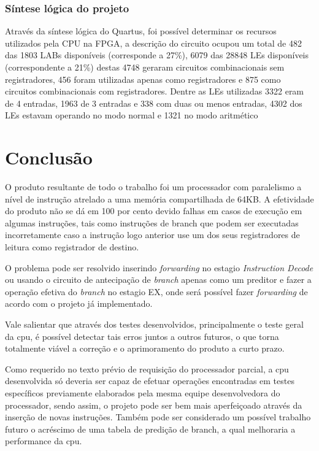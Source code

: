 \documentclass[
	11pt,				%
	openany,			%
	oneside,
	a4paper,			%
	chapter=TITLE,		%
	section=TITLE,		%
	english,			%
	brazil				%
	]{abntex2}
\begin{document}
\subsection{Síntese lógica do projeto}
Através da síntese lógica do Quartus, foi possível determinar os recursos utilizados pela CPU na FPGA, a descrição do circuito ocupou um total de 482 das 1803 LABs disponíveis (corresponde a 27\%), 6079 das 28848 LEs disponíveis (correspondente a 21\%) destas 4748 geraram circuitos combinacionais sem registradores, 456 foram utilizadas apenas como registradores e 875 como circuitos combinacionais com registradores. Dentre as LEs utilizadas 3322 eram de 4 entradas, 1963 de 3 entradas e 338 com duas ou menos entradas, 4302 dos LEs estavam operando no modo normal e 1321 no modo aritmético


\chapter{Conclusão}
O produto resultante de todo o trabalho foi um processador com paralelismo a nível de instrução atrelado a uma memória compartilhada de 64KB. A efetividade do produto não se dá em 100 por cento devido falhas em casos de execução em algumas instruções, tais como instruções de branch que podem ser executadas incorretamente caso a instrução logo anterior use um dos seus registradores de leitura como registrador de destino.

O problema pode ser resolvido inserindo \textit{forwarding} no estagio \textit{Instruction Decode} ou usando o circuito de antecipação de \textit{branch} apenas como um preditor e fazer a operação efetiva do \textit{branch} no estagio EX, onde será possível fazer \textit{forwarding} de acordo com o projeto já implementado.

Vale salientar que através dos testes desenvolvidos, principalmente o teste geral da cpu, é possível detectar tais erros juntos a outros futuros, o que torna totalmente viável a correção e o aprimoramento do produto a curto prazo.

Como requerido no texto prévio de requisição do processador parcial, a cpu desenvolvida só deveria ser capaz de efetuar operações encontradas em testes específicos previamente elaborados pela mesma equipe desenvolvedora do processador, sendo assim, o projeto pode ser bem mais aperfeiçoado através da inserção de novas instruções. Também pode ser considerado um possível trabalho futuro o acréscimo de uma tabela de predição de branch, a qual melhoraria a performance da cpu.
\endgroup
\end{document}
